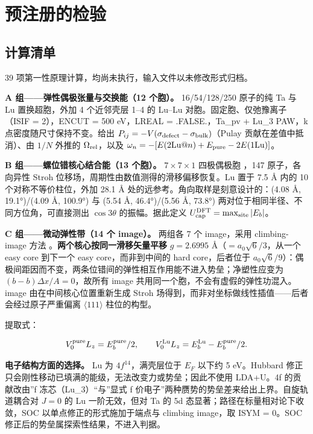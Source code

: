 \documentclass[11pt,a4paper]{article}
\begin{document}
\hypertarget{ux9884ux6ce8ux518cux7684ux68c0ux9a8c}{%
\section{预注册的检验}\label{sec:ux9884ux6ce8ux518cux7684ux68c0ux9a8c}}

\hypertarget{ux8ba1ux7b97ux6e05ux5355}{%
\subsection{计算清单}\label{sec:ux8ba1ux7b97ux6e05ux5355}}

39 项第一性原理计算，均尚未执行，输入文件以未修改形式归档。

\textbf{A 组------弹性偶极张量与交换能（12 个胞）。} 16/54/128/250 原子的纯 Ta 与 Lu 置换超胞，外加 4 个近邻壳层 1--4 的 Lu--Lu 对胞。固定胞、仅弛豫离子（ISIF = 2），ENCUT = 500 eV，LREAL = .FALSE.，Ta\_pv + Lu\_3 PAW，k 点密度随尺寸保持不变。给出 \(P_{ij} = -V(\sigma_{\rm defect} - \sigma_{\rm bulk})\)（Pulay 贡献在差值中抵消）、由 \(1/N\) 外推的 \(\Omega_{\rm rel}\)，以及 \(\omega_n = -[E(2\mathrm{Lu}@n) + E_{\rm pure} - 2E(1\mathrm{Lu})]\)。

\textbf{B 组------螺位错核心结合能（13 个胞）。} \(7\times7\times1\) 四极偶极胞 \cite{ventelon2007}，147 原子，各向异性 Stroh 位移场，周期性由数值测得的滑移偏移恢复。Lu 置于 7.5 Å 内的 10 个对称不等价柱位，外加 28.1 Å 处的远参考。角向取样是刻意设计的：(4.08 Å, 19.1°)/(4.09 Å, 100.9°) 与 (5.54 Å, 46.4°)/(5.56 Å, 73.8°) 两对位于相同半径、不同方位角，可直接测出 \(\cos3\theta\) 的振幅。据此定义 \(U_{\rm cap}^{\rm DFT} = \max_{\rm site}|E_b|\)。

\textbf{C 组------微动弹性带（14 个 image）。} 两组各 7 个 image，采用 climbing-image 方法 \cite{henkelman2000}。\textbf{两个核心按同一滑移矢量平移} \(g = 2.6995\) Å（\(= a_0\sqrt{6}/3\)，从一个 easy core 到下一个 easy core，而非到中间的 hard core，后者位于 \(a_0\sqrt{6}/9\)）：偶极间距因而不变，两条位错间的弹性相互作用能不进入势垒；净塑性应变为 \((b-b)\Delta x/A = 0\)，故所有 image 共用同一个胞，不会有虚假的弹性功混入。image 由在中间核心位置重新生成 Stroh 场得到，而非对坐标做线性插值------后者会经过原子严重偏离 \(\langle111\rangle\) 柱位的构型。

提取式：

\[V_0^{\rm pure}L_z = E_b^{\rm pure}/2,\qquad V_0^{\rm Lu}L_z = E_b^{\rm Lu} - E_b^{\rm pure}/2.\]

\textbf{电子结构方面的选择。} Lu 为 \(4f^{14}\)，满壳层位于 \(E_F\) 以下约 5 eV。Hubbard 修正只会刚性移动已填满的能级，无法改变力或势垒；因此不使用 LDA+U。4f 的贡献改由''f 冻芯（Lu\_3）``与''显式 f 价电子''两种赝势的势垒差来给出上界。自旋轨道耦合对 \(J = 0\) 的 Lu 一阶无效，但对 Ta 的 5d 态显著；路径在标量相对论下收敛，SOC 以单点修正的形式施加于端点与 climbing image，取 ISYM = 0。SOC 修正后的势垒属探索性结果，不进入判据。
\end{document}

